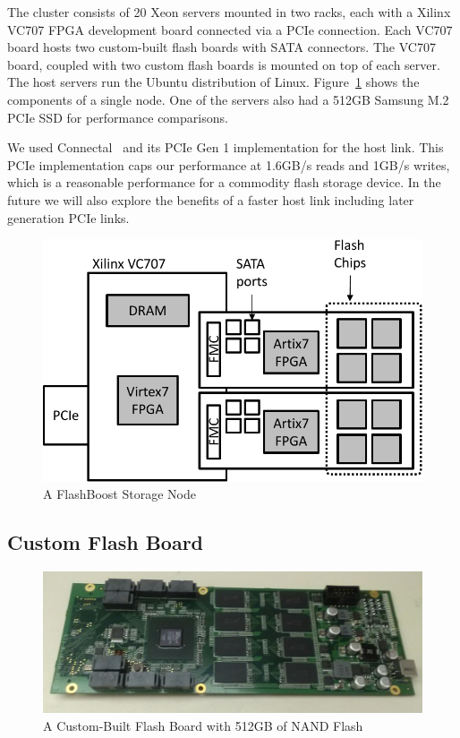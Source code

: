 The cluster consists of 20 Xeon servers mounted in two racks, each with a Xilinx
VC707 FPGA development board connected via a PCIe connection. Each VC707 board
hosts two custom-built flash boards with SATA connectors. The VC707 board,
coupled with two custom flash boards is mounted on top of each server.
The host servers run the Ubuntu distribution of Linux.
Figure~\ref{fig:bluedbmnode} shows the components of a single node.
One of the servers also had a 512GB Samsung M.2 PCIe SSD for performance
comparisons.

We used Connectal~\cite{connectal} and its PCIe Gen 1 implementation for the
host link. This PCIe implementation caps our performance at 1.6GB/s reads and
1GB/s writes, which is a reasonable performance for a commodity flash storage
device. In the future we will also explore the benefits of a faster host link
including later generation PCIe links.

\begin{figure}[ht]
	\begin{center}
	\includegraphics[width=0.4\paperwidth]{figures/storagenode-crop.pdf}
	\caption{A FlashBoost Storage Node}
	\label{fig:bluedbmnode}
	\end{center}
\end{figure}


\subsection{Custom Flash Board}

\begin{figure}[ht]
	\begin{center}
	\includegraphics[width=0.4\paperwidth]{figures/flashboard.jpg}
	\caption{A Custom-Built Flash Board with 512GB of NAND Flash}
	\label{fig:flashboard}
	\end{center}
\end{figure}

